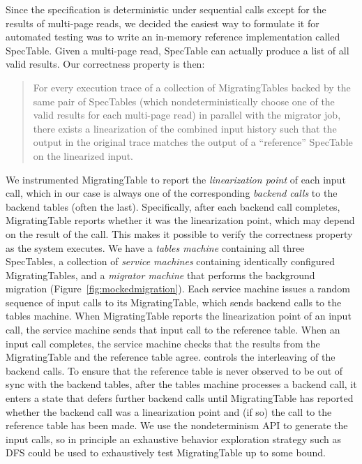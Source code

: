 Since the specification is deterministic under sequential calls except for the results of multi-page reads, we decided the easiest way to formulate it for automated testing was to write an in-memory reference implementation called SpecTable.  Given a multi-page read, SpecTable can actually produce a list of all valid results.  Our correctness property is then:
\begin{quote}
For every execution trace of a collection of MigratingTables backed by the same pair of SpecTables (which nondeterministically choose one of the valid results for each multi-page read) in parallel with the migrator job, there exists a linearization of the combined input history such that the output in the original trace matches the output of a ``reference'' SpecTable on the linearized input.
\end{quote}
%
\def\term#1{\emph{#1}}
We instrumented MigratingTable to report the \term{linearization point} of each input call, which in our case is always one of the corresponding \term{backend calls} to the backend tables (often the last).  Specifically, after each backend call completes, MigratingTable reports whether it was the linearization point, which may depend on the result of the call.  This makes it possible to verify the correctness property as the system executes.  We have a \psharp \term{tables machine} containing all three SpecTables, a collection of \term{service machines} containing identically configured MigratingTables, and a \term{migrator machine} that performs the background migration (Figure~\ref{fig:mockedmigration}).  Each service machine issues a random sequence of input calls to its MigratingTable, which sends backend calls to the tables machine.  When MigratingTable reports the linearization point of an input call, the service machine sends that input call to the reference table.  When an input call completes, the service machine checks that the results from the MigratingTable and the reference table agree.  \psharp controls the interleaving of the backend calls.  To ensure that the reference table is never observed to be out of sync with the backend tables, after the tables machine processes a backend call, it enters a state that defers further backend calls until MigratingTable has reported whether the backend call was a linearization point and (if so) the call to the reference table has been made.  We use the \psharp nondeterminism API to generate the input calls, so in principle an exhaustive \psharp behavior exploration strategy such as DFS could be used to exhaustively test MigratingTable up to some bound.

